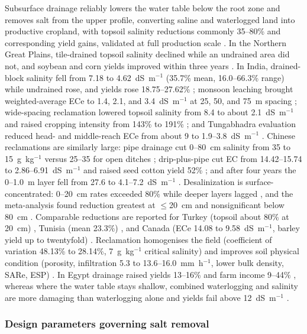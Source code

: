 Subsurface drainage reliably lowers the water table below the root zone and
removes salt from the upper profile, converting saline and waterlogged land into
productive cropland, with topsoil salinity reductions commonly 35--80\% and
corresponding yield gains, validated at full production scale
\parencite{Yang2025,Derby2024}. In the Northern Great Plains, tile-drained
topsoil salinity declined while an undrained area did not, and soybean and corn
yields improved within three years \parencite{Derby2024}. In India, drained-block
salinity fell from 7.18 to 4.62~dS~m$^{-1}$ (35.7\% mean, 16.0--66.3\% range)
while undrained rose, and yields rose 18.75--27.62\% \parencite{Sharma2006};
monsoon leaching brought weighted-average ECe to 1.4, 2.1, and 3.4~dS~m$^{-1}$ at
25, 50, and 75~m spacing \parencite{Sharma2000}; wide-spacing reclamation lowered
topsoil salinity from 8.4 to about 2.1~dS~m$^{-1}$ and raised cropping intensity
from 143\% to 191\% \parencite{Manjunatha2004}; and Tungabhadra evaluation reduced
head- and middle-reach ECe from about 9 to 1.9--3.8~dS~m$^{-1}$
\parencite{Karegoudar2022}. Chinese reclamations are similarly large: pipe
drainage cut 0--80~cm salinity from 35 to 15~g~kg$^{-1}$ versus 25--35 for open
ditches \parencite{Wang2020}; drip-plus-pipe cut EC from 14.42--15.74 to
2.86--6.91~dS~m$^{-1}$ and raised seed cotton yield 52\% \parencite{Heng2021}; and
after four years the 0--1.0~m layer fell from 27.6 to 4.1--7.2~dS~m$^{-1}$
\parencite{Zhang2021}. Desalinization is surface-concentrated: 0--20~cm rates
exceeded 80\% while deeper layers lagged \parencite{Han2023}, and the
meta-analysis found reduction greatest at $\leq$20~cm and nonsignificant below
80~cm \parencite{Yang2025}. Comparable reductions are reported for Turkey
(topsoil about 80\% at 20~cm) \parencite{Bahçeci2009}, Tunisia (mean 23.3\%)
\parencite{HajAmor2019}, and Canada (ECe 14.08 to 9.58~dS~m$^{-1}$, barley yield
up to twentyfold) \parencite{Steppuhn2006,Steppuhn2017}. Reclamation homogenises
the field (coefficient of variation 48.13\% to 28.14\%, 7~g~kg$^{-1}$ critical
salinity) \parencite{Yu2015,Yu2025} and improves soil physical condition
(porosity, infiltration 5.3 to 13.6--16.0~mm~h$^{-1}$, lower bulk density, SARe,
ESP) \parencite{Sharma2000,Yang2025}. In Egypt drainage raised yields 13--16\%
and farm income 9--44\% \parencite{Kotb2000}, whereas where the water table stays
shallow, combined waterlogging and salinity are more damaging than waterlogging
alone and yields fail above 12~dS~m$^{-1}$ \parencite{Kahlown2002}.

\subsubsection{Design parameters governing salt removal}

